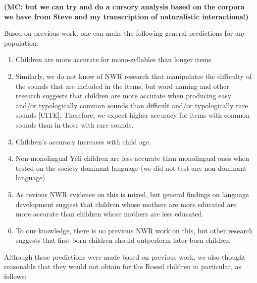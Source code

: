 \documentclass[english,,man,floatsintext]{apa6}
\providecommand{\tightlist}{%
  \setlength{\itemsep}{0pt}\setlength{\parskip}{0pt}}
\begin{document}
\textbf{(MC: but we can try and do a cursory analysis based on the corpora we have from Steve and my transcription of naturalistic interactions!)}

Based on previous work, one can make the following general predictions for any population:

\begin{enumerate}
\def\labelenumi{\arabic{enumi}.}
\tightlist
\item
  Children are more accurate for mono-syllables than longer items
\item
  Similarly, we do not know of NWR research that manipulates the difficulty of the sounds that are included in the items, but word naming and other research suggests that children are more accurate when producing easy and/or typologically common sounds than difficult and/or typologically rare sounds {[}CITE{]}. Therefore, we expect higher accuracy for items with common sounds than in those with rare sounds.
\item
  Children's accuracy increases with child age.
\item
  Non-monolingual Yélî children are less accurate than monolingual ones when tested on the society-dominant language (we did not test any non-dominant language)
\item
  As revious NWR evidence on this is mixed, but general findings on language development suggest that children whose mothers are more educated are more accurate than children whose mothers are less educated.
\item
  To our knowledge, there is no previous NWR work on this, but other research suggests that first-born children should outperform later-born children
\end{enumerate}

Although these predictions were made based on previous work, we also thought reasonable that they would not obtain for the Rossel children in particular, as follows:
\end{document}
